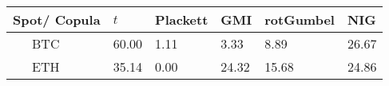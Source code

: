     {\begin{tabularx}{\textwidth}{lYYYYY} \toprule
         Spot/ Copula & $t$ & Plackett & GMI & rotGumbel & NIG \\ \midrule
        \ \ \ BTC          & 60.00          & 1.11              & 3.33                        & 8.89                  & 26.67                  \\
        \ \ \ ETH          & 35.14          & 0.00              & 24.32                       & 15.68                 & 24.86                   \\
    \bottomrule
    \end{tabularx}
       }








